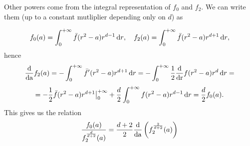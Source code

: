 Other powers come from the integral representation of $f_0$ and $f_2$. We can write them (up to a constant mutliplier depending only on $d$) as

\begin{equation*}
        f_0(a) = \int_{0}^{+\infty} \bar f(r^2-a)r^{d-1}{\,\mathrm dr}, \quad f_2(a) = \int_{0}^{+\infty} \bar f(r^2-a)r^{d+1}{\,\mathrm dr},
\end{equation*}
hence
\begin{equation*}
        \frac{\mathrm d}{\mathrm {d {a}}} f_2(a) = -\int_{0}^{+\infty} \bar f'(r^2-a)r^{d+1}{\,\mathrm dr} = -\int_{0}^{+\infty}\frac{1}{2} \frac{\mathrm d}{\mathrm {d {r}}} f(r^2-a)r^{d}{\,\mathrm dr} =  
\end{equation*}
\begin{equation*}
        =-\frac 12 \bar f(r^2-a)r^{d+1}\big|_0^{+\infty} + \frac d2 \int_{0}^{+\infty}f(r^2-a)r^{d-1}{\,\mathrm dr} = \frac {d}{2} f_0(a).
\end{equation*}
This gives us the relation
\begin{equation*}
        \frac{f_0(a)}{f_2^{\frac{d}{d+2}}(a)} =  \frac{d+2}{2}\frac{\mathrm d}{\mathrm {d {a}}} \left( f_2^{\frac{2}{d+2}}(a) \right)
\end{equation*}

